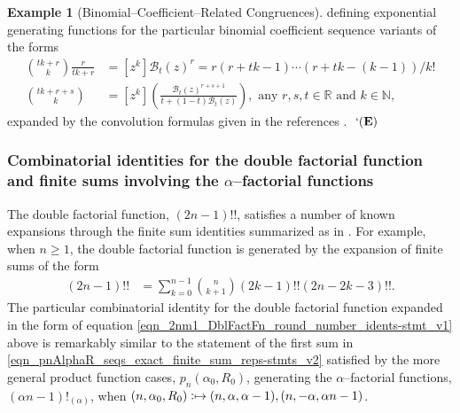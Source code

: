 \documentclass[12pt,reqno]{article}
\numberwithin{sfootnote}{section}
\numberwithin{equation}{section}
\theoremstyle{DefaultTheoremStyle}
\theoremstyle{definition}
\newtheorem{example}[theorem]{Example}
\newcommand{\eolqedsymbol}[1]{{\hrulefill\ensuremath{\ #1}}}
\renewcommand{\eolqedsymbol}[1]{{\mboxfill{ }\ensuremath{\ #1}}}
\newcommand{\ExampleQEDSymbol}{`(\text{\rm{\bf E}})}
\newcommand{\ExampleQED}{\eolqedsymbol{\ExampleQEDSymbol}}
\newcommand{\defmapsto}{\ensuremath{\vcentcolon\mapsto}}
\newcommand{\AlphaFactorial}[2]{\ensuremath{\left(#1\right)!_{\left(#2\right)}}}
\newcommand{\pn}[3]{\ensuremath{p_{#1}\left(#2, #3\right)}}
\begin{document}
\begin{example}[Binomial--Coefficient--Related Congruences]
defining exponential generating functions for the particular 
binomial coefficient sequence variants of the forms 
\begin{align*} 
     \binom{tk+r}{k} \frac{r}{tk+r} & = 
     [z^k] \mathcal{B}_t(z)^{r} = 
     r(r+tk-1) \cdots (r+tk-(k-1)) / k! \\ 
\binom{tk+r+s}{k} & = 
     [z^k] \left( 
     \frac{\mathcal{B}_t(z)^{r+s+1}}{t+(1-t) \mathcal{B}_t(z)} 
     \right), 
     \text{ any $r,s,t \in \mathbb{R}$ \ and \ $k \in \mathbb{N}$}, 
\end{align*} 
expanded by the convolution formulas given in the 
references \citep[\S 5.4; Table 169, Table 202]{GKP} \citep{CVLPOLYS}. 
\ExampleQED 
\end{example} 

\subsubsection{Combinatorial identities for the 
               double factorial function and 
               finite sums involving the $\alpha$--factorial functions} 
\label{ssS_example_GenDblFactFnSumIdents_FiniteSumsInvolving_AlphaFactFns} 

The double factorial function, $(2n-1)!!$, satisfies a number of 
known expansions through the finite sum identities summarized as in 
\citep{MAA-FUN-WITH-DBLFACT,DBLFACTFN-COMBIDENTS-SURVEY}. 
For example, when $n \geq 1$, the 
double factorial function is generated by the 
expansion of finite sums of the form 
\citep[\S 4.1]{DBLFACTFN-COMBIDENTS-SURVEY} 
\begin{align} 
\label{eqn_2nm1_DblFactFn_round_number_idents-stmt_v1}
(2n-1)!! & = 
     \sum_{k=0}^{n-1} \binom{n}{k+1} (2k-1)!! (2n-2k-3)!!. 
\end{align} 
The particular combinatorial identity for the double factorial 
function expanded in the form of equation 
\eqref{eqn_2nm1_DblFactFn_round_number_idents-stmt_v1} above 
is remarkably similar to the statement of the first sum in 
\eqref{eqn_pnAlphaR_seqs_exact_finite_sum_reps-stmts_v2} 
satisfied by the more general product function cases, 
$\pn{n}{\alpha_0}{R_0}$, 
generating the $\alpha$--factorial functions, 
$\AlphaFactorial{\alpha n-1}{\alpha}$, when 
$(n, \alpha_0, R_0) \defmapsto (n, \alpha, \alpha-1), (n, -\alpha, \alpha n-1)$. 
\end{document}

